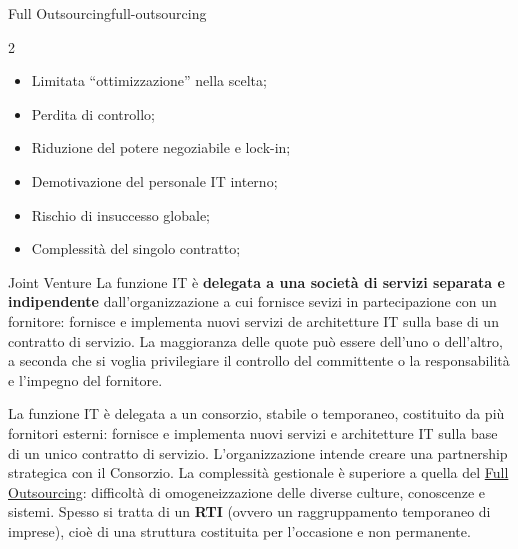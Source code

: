 \begin{description}
\begin{definition}{Full Outsourcing}{full-outsourcing}
\begin{description}
\begin{multicols}{2}
                        \begin{itemize}
                            \item Limitata ``ottimizzazione'' nella scelta;
                            \item Perdita di controllo;
                            \item Riduzione del potere negoziabile e lock-in;
                            \item Demotivazione del personale IT interno;
                            \item Rischio di insuccesso globale;
                            \item Complessità del singolo contratto;
                        \end{itemize}
                    \end{multicols}
            \end{description}
        \end{definition}
        \begin{definition}{Joint Venture}{}
            La funzione IT è \textbf{delegata a una società di servizi separata e indipendente} dall'organizzazione a cui fornisce sevizi in partecipazione con un fornitore: fornisce e implementa nuovi servizi de architetture IT sulla base di un contratto di servizio.
            \emptyln{}
            La maggioranza delle quote può essere dell'uno o dell'altro, a seconda che si voglia privilegiare il controllo del committente o la responsabilità e l'impegno del fornitore.
        \end{definition}
        \begin{note}
            La funzione IT è delegata a un consorzio, stabile o temporaneo, costituito da più fornitori esterni: fornisce e implementa nuovi servizi e architetture IT sulla base di un unico contratto di servizio.
            L'organizzazione intende creare una partnership strategica con il Consorzio.
            \emptyln{}
            La complessità gestionale è superiore a quella del \hyperref[def:full-outsourcing]{Full Outsourcing}: difficoltà di omogeneizzazione delle diverse culture, conoscenze e sistemi.
            Spesso si tratta di un \textbf{RTI} (ovvero un raggruppamento temporaneo di imprese), cioè di una struttura costituita per l'occasione e non permanente.
        \end{note}
\end{description}
%
